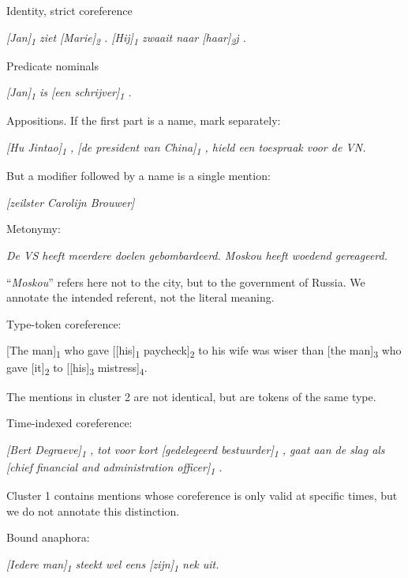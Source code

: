 \begin{itemize*}
\item Identity, strict coreference

    \emph{[Jan]\textsubscript{1} ziet [Marie]\textsubscript{2} .
    [Hij]\textsubscript{1} zwaait naar [haar]\textsubscript{2}j .}

\item Predicate nominals

  \emph{{[}Jan{]}\textsubscript{1} is {[}een schrijver{]}\textsubscript{1} .}

\item Appositions. If the first part is a name, mark separately:

  \emph{{[}Hu Jintao{]}\textsubscript{1} , {[}de president van China{]}\textsubscript{1} , hield een
  toespraak voor de VN.}
  
  But a modifier followed by a name is a single mention:
  
  \emph{{[}zeilster Carolijn Brouwer{]}}
  
\item Metonymy:

    \emph{De VS heeft meerdere doelen gebombardeerd. Moskou heeft woedend
  gereageerd.}
  
  ``\emph{Moskou}'' refers here not to the city, but to the government of
  Russia. We annotate the intended referent, not the literal meaning.
  
\item Type-token coreference:

  {[}The man{]}\textsubscript{1} who gave {[}{[}his{]}\textsubscript{1} paycheck{]}\textsubscript{2} to
  his wife was wiser than {[}the man{]}\textsubscript{3} who gave {[}it{]}\textsubscript{2} to
  [{[}his{]}\textsubscript{3} mistress]\textsubscript{4}.
  
  The mentions in cluster 2 are not identical, but are tokens of the
  same type.
  
\item Time-indexed coreference:

  \emph{{[}Bert Degraeve{]}\textsubscript{1} , tot voor kort {[}gedelegeerd
  bestuurder{]}\textsubscript{1} , gaat aan de slag als {[}chief financial and
  administration officer{]}\textsubscript{1} .}
  
  Cluster 1 contains mentions whose coreference is only valid at
  specific times, but we do not annotate this distinction.
\item Bound anaphora:

  \emph{{[}Iedere man{]}\textsubscript{1} steekt wel eens {[}zijn{]}\textsubscript{1} nek uit.}
  
\end{itemize*}


